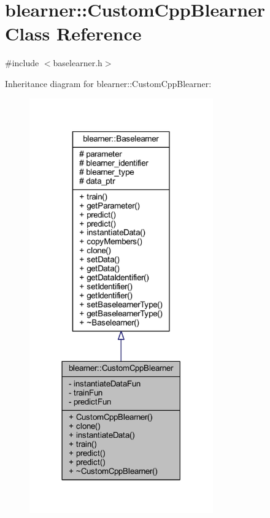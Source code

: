 \hypertarget{classblearner_1_1_custom_cpp_blearner}{}\section{blearner\+:\+:Custom\+Cpp\+Blearner Class Reference}
\label{classblearner_1_1_custom_cpp_blearner}


{\ttfamily \#include $<$baselearner.\+h$>$}



Inheritance diagram for blearner\+:\+:Custom\+Cpp\+Blearner\+:
\nopagebreak
\begin{figure}[H]
\begin{center}
\leavevmode
\includegraphics[width=224pt]{classblearner_1_1_custom_cpp_blearner__inherit__graph}
\end{center}
\end{figure}


